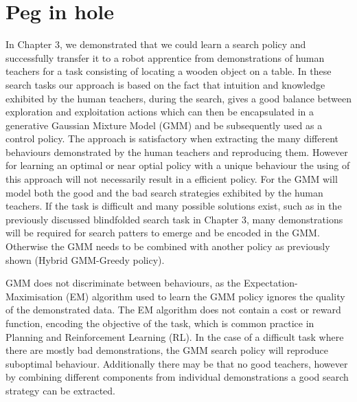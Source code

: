 \chapter{Peg in hole}

In Chapter 3, we demonstrated that we could learn a search policy and successfully transfer it to a robot apprentice
from demonstrations of human teachers for a task consisting of locating a wooden object on a table. 
In these search tasks our approach is based on the fact that intuition and knowledge exhibited by the human teachers, 
during the search, gives a good balance between exploration and exploitation actions which can then be encapsulated in 
a generative Gaussian Mixture Model (GMM) and be subsequently used as a control policy. 
The approach is satisfactory when extracting the many different behaviours demonstrated by the human teachers and reproducing 
them. However for learning an optimal or near optial policy with a unique behaviour the using  
of this approach will not necessarily result in a efficient policy. For the GMM will model
both the good and the bad search strategies exhibited by the human teachers. If the task is difficult and many possible solutions exist, such 
as in the previously discussed blindfolded search task in Chapter 3, many demonstrations will be required for search patters to
emerge and be encoded in the GMM. Otherwise the GMM needs to be combined with another policy as previously shown (Hybrid GMM-Greedy 
policy). 


GMM does not discriminate between behaviours, as the Expectation-Maximisation (EM) algorithm used to 
learn the GMM policy ignores the quality of the demonstrated data. The EM algorithm does not contain a cost or 
reward function, encoding the objective of the task, which is common practice in Planning and Reinforcement Learning (RL). 
In the case of a difficult task where there are mostly bad demonstrations, the GMM search policy will reproduce suboptimal behaviour.
Additionally there may be that no good teachers, however by combining different components from 
individual demonstrations a good search strategy can be extracted.


